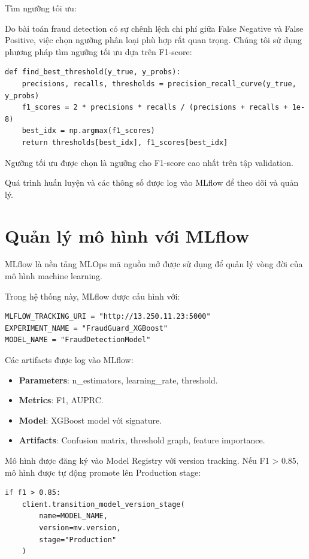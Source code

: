 Tìm ngưỡng tối ưu:

Do bài toán fraud detection có sự chênh lệch chi phí giữa False Negative và False Positive, việc chọn ngưỡng phân loại phù hợp rất quan trọng. Chúng tôi sử dụng phương pháp tìm ngưỡng tối ưu dựa trên F1-score:

\begin{verbatim}
def find_best_threshold(y_true, y_probs):
    precisions, recalls, thresholds = precision_recall_curve(y_true, y_probs)
    f1_scores = 2 * precisions * recalls / (precisions + recalls + 1e-8)
    best_idx = np.argmax(f1_scores)
    return thresholds[best_idx], f1_scores[best_idx]
\end{verbatim}

Ngưỡng tối ưu được chọn là ngưỡng cho F1-score cao nhất trên tập validation.

Quá trình huấn luyện và các thông số được log vào MLflow để theo dõi và quản lý.

\section{Quản lý mô hình với MLflow}

MLflow là nền tảng MLOps mã nguồn mở được sử dụng để quản lý vòng đời của mô hình machine learning.

Trong hệ thống này, MLflow được cấu hình với:

\begin{verbatim}
MLFLOW_TRACKING_URI = "http://13.250.11.23:5000"
EXPERIMENT_NAME = "FraudGuard_XGBoost"
MODEL_NAME = "FraudDetectionModel"
\end{verbatim}

Các artifacts được log vào MLflow:
\begin{itemize}
    \item \textbf{Parameters}: n\_estimators, learning\_rate, threshold.
    \item \textbf{Metrics}: F1, AUPRC.
    \item \textbf{Model}: XGBoost model với signature.
    \item \textbf{Artifacts}: Confusion matrix, threshold graph, feature importance.
\end{itemize}

Mô hình được đăng ký vào Model Registry với version tracking. Nếu F1 > 0.85, mô hình được tự động promote lên Production stage:

\begin{verbatim}
if f1 > 0.85:
    client.transition_model_version_stage(
        name=MODEL_NAME,
        version=mv.version,
        stage="Production"
    )
\end{verbatim}

